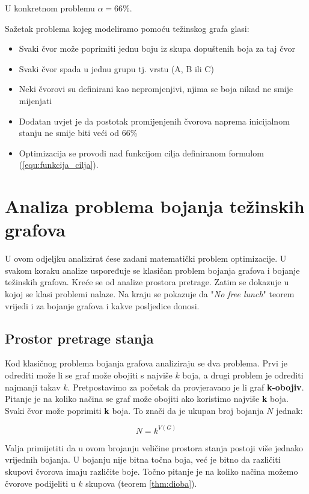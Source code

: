 \documentclass[times, utf8, diplomski, numeric]{fer}
\begin{document}
U konkretnom problemu $\alpha=66\%$.

Sažetak problema kojeg modeliramo pomoću težinskog grafa glasi:
\begin{itemize}
	\item Svaki čvor može poprimiti jednu boju iz skupa dopuštenih boja za taj čvor
	\item Svaki čvor spada u jednu grupu tj. vrstu (A, B ili C)
	\item Neki čvorovi su definirani kao nepromjenjivi, njima se boja nikad ne smije mijenjati
	\item Dodatan uvjet je da postotak promijenjenih čvorova naprema inicijalnom stanju ne smije biti veći od 66\%
	\item Optimizacija se provodi nad funkcijom cilja definiranom formulom (\ref{equ:funkcija_cilja}).
\end{itemize}

\section{Analiza problema bojanja težinskih grafova}

U ovom odjeljku analizirat ćese zadani matematički problem optimizacije. U svakom koraku analize uspoređuje se klasičan problem bojanja grafova i bojanje težinskih grafova. Kreće se od analize prostora pretrage. Zatim se dokazuje u kojoj se klasi problemi nalaze. Na kraju se pokazuje da "\emph{No free lunch}" teorem vrijedi i za bojanje grafova i kakve posljedice donosi.

\subsection{Prostor pretrage stanja}

Kod klasičnog problema bojanja grafova analiziraju se dva problema. Prvi je odrediti može li se graf može obojiti s najviše $k$ boja, a drugi problem je odrediti najmanji takav $k$. Pretpostavimo za početak da provjeravano je li graf \textbf{k-obojiv}. Pitanje je na koliko načina se graf može obojiti ako koristimo najviše \textbf{k} boja. Svaki čvor može poprimiti \textbf{k} boja. To znači da je ukupan broj bojanja $N$ jednak: 

\begin{equation}
N = k^{V(G)} 
\end{equation}

Valja primijetiti da u ovom brojanju veličine prostora stanja postoji više jednako vrijednih bojanja. U bojanju nije bitna točna boja, već je bitno da različiti skupovi čvorova imaju različite boje. Točno pitanje je na koliko načina možemo čvorove podijeliti u $k$ skupova (teorem \ref{thm:dioba}).  
\end{document}
